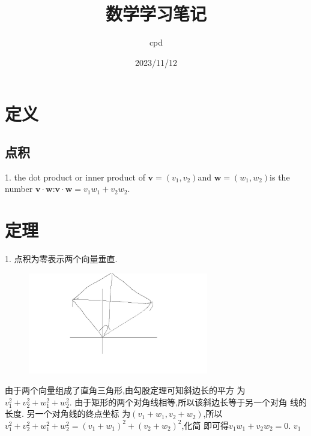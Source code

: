 \documentclass[UTF-8]{ctexart}
\begin{document}
\title {数学学习笔记} \author{cpd} \date{2023/11/12}
\maketitle

\tableofcontents
\newpage

\section{定义}

\subsection{点积}
1. the dot product or inner product of $\mathbf{v} =(v_1,v_2)$and
$\mathbf{w}=(w_1,w_2)$is the number $\mathbf{v} \cdot \mathbf{w}$:$\mathbf{v}
\cdot \mathbf{w} = v_1w_1+v_2w_2$.
\section{定理}
1. 点积为零表示两个向量垂直.
\begin{figure}[H] %
  \centering %
  \includegraphics[width=0.7\textwidth]{images/math/1.jpg} %
\end{figure}
由于两个向量组成了直角三角形,由勾股定理可知斜边长的平方
为$v_1^2+v_2^2+w_1^2+w_2^2$. 由于矩形的两个对角线相等,所以该斜边长等于另一个对角
线的长度. 另一个对角线的终点坐标
为$(v_1+w_1,v_2+w_2)$,所以$v_1^2+v_2^2+w_1^2+w_2^2=(v_1+w_1)^2+(v_2+w_2)^2$,化简
即可得$v_1w_1+v_2w_2=0$. $v_1$
\end{document}
